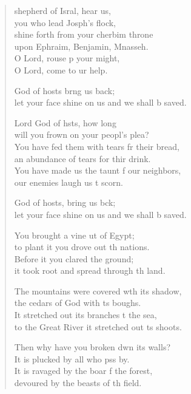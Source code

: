 \settowidth{\versewidth}{Men have burnt it with fire and destroyed it. }
\begin{verse}%
  \begin{patverse}
 shepherd of Isral, hear us,\Med\\
you who lead Josph’s flock,\\
shine forth from your cherbim throne\Med\\
upon Ephraim, Benjamin, Mnasseh.\\
O Lord, rouse p your might,\Med\\
O Lord, come to ur help.

God of hosts br\pointup{\i}ng us back;\Med\\
let your face shine on us and we shall b saved.

Lord God of hsts, how long\Med\\
will you frown on your peopl’s plea?\\
You have fed them with tears fr their bread,\Med\\
an abundance of tears for thir drink.\\
You have made us the taunt f our neighbors,\Med\\
our enemies laugh us t scorn.

God of hosts, bring us bck;\Med\\
let your face shine on us and we shall b saved.

You brought a vine ut of Egypt;\Med\\
to plant it you drove out th nations.\\
Before it you clared the ground;\Med\\
it took root and spread through th land.

The mountains were covered w\pointup{\i}th its shadow,\Med\\
the cedars of God with \pointup{\i}ts boughs.\\
It stretched out its branches t the sea,\Med\\
to the Great River it stretched out \pointup{\i}ts shoots.

Then why have you broken dwn its walls?\Med\\
It is plucked by all who pss by.\\
It is ravaged by the boar f the forest,\Med\\
devoured by the beasts of th field.


\end{patverse}
\end{verse}
